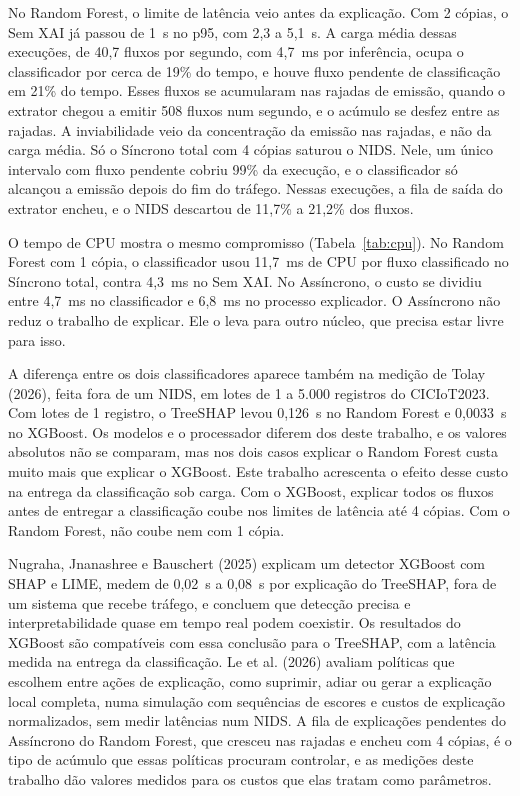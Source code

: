 \documentclass[
  article,
  12pt,
  oneside,
  a4paper,
  english,
  brazil
]{abntex2}
\begin{document}
No Random Forest, o limite de latência veio antes da explicação. Com 2 cópias, o Sem XAI já passou de
1~s no p95, com 2,3 a 5,1~s. A carga média dessas execuções, de 40,7 fluxos por segundo, com 4,7~ms
por inferência, ocupa o classificador por cerca de 19\% do tempo, e houve fluxo pendente de
classificação em 21\% do tempo. Esses fluxos se acumularam nas rajadas de
emissão, quando o extrator chegou a emitir 508 fluxos num segundo, e o acúmulo se desfez entre as
rajadas. A inviabilidade veio da concentração da emissão nas rajadas, e não da carga média. Só o
Síncrono total com 4 cópias saturou o NIDS. Nele, um único intervalo com fluxo pendente cobriu 99\%
da execução, e o classificador só alcançou a emissão depois do fim do tráfego. Nessas
execuções, a fila de saída do extrator encheu, e o NIDS descartou de 11,7\% a 21,2\% dos fluxos.

O tempo de CPU mostra o mesmo compromisso (Tabela~\ref{tab:cpu}). No Random Forest com 1 cópia, o
classificador usou 11,7~ms de CPU por fluxo classificado no Síncrono total, contra 4,3~ms no Sem XAI.
No Assíncrono, o custo se dividiu entre 4,7~ms no classificador e 6,8~ms no processo explicador. O
Assíncrono não reduz o trabalho de explicar. Ele o leva para outro núcleo, que precisa estar livre
para isso.

A diferença entre os dois classificadores aparece também na medição de Tolay (2026), feita fora de
um NIDS, em lotes de 1 a 5.000 registros do CICIoT2023. Com lotes de 1 registro, o TreeSHAP levou
0,126~s no Random Forest e 0,0033~s no XGBoost. Os modelos e o processador diferem dos deste
trabalho, e os valores absolutos não se comparam, mas nos dois casos explicar o Random Forest custa
muito mais que explicar o XGBoost. Este trabalho acrescenta o efeito desse custo na entrega da
classificação sob carga. Com o XGBoost, explicar todos os fluxos antes de entregar a classificação
coube nos limites de latência até 4 cópias. Com o Random Forest, não coube nem com 1 cópia.

Nugraha, Jnanashree e Bauschert (2025) explicam um detector XGBoost com SHAP e LIME, medem de 0,02~s
a 0,08~s por explicação do TreeSHAP, fora de um sistema que recebe tráfego, e concluem que detecção
precisa e interpretabilidade quase em tempo real podem coexistir. Os resultados do XGBoost são
compatíveis com essa conclusão para o TreeSHAP, com a latência medida na entrega da classificação. Le
et al. (2026) avaliam políticas que escolhem entre ações de explicação, como suprimir, adiar ou gerar
a explicação local completa, numa simulação com sequências de escores e custos de explicação
normalizados, sem medir latências num NIDS. A fila de explicações pendentes do Assíncrono do Random
Forest, que cresceu nas rajadas e encheu com 4 cópias, é o tipo de acúmulo que essas políticas
procuram controlar, e as medições deste trabalho dão valores medidos para os custos que elas tratam
como parâmetros.
\end{document}
